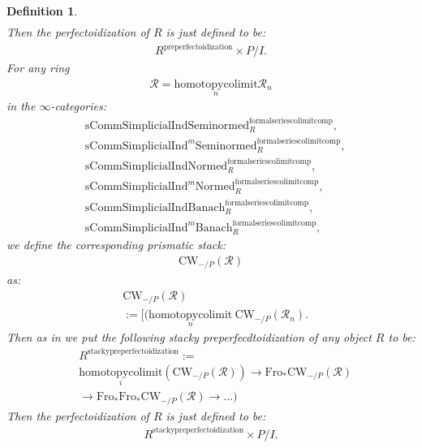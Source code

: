 \documentclass[12pt]{book}
\newtheorem{definition}{Definition}
\begin{document}
\begin{definition}
\begin{align}
\end{align}
Then the perfectoidization of $R$ is just defined to be:
\begin{align}
R^\mathrm{preperfectoidization}\times P/I.	
\end{align}
For any ring
\begin{align}
\mathcal{R}=\underset{n}{\mathrm{homotopycolimit}}\mathcal{R}_n	
\end{align}
in the $\infty$-categories:
\begin{align}
&\mathrm{sComm}\mathrm{Simplicial}\mathrm{Ind}\mathrm{Seminormed}^\mathrm{formalseriescolimitcomp}_R,\\
&\mathrm{sComm}\mathrm{Simplicial}\mathrm{Ind}^m\mathrm{Seminormed}^\mathrm{formalseriescolimitcomp}_R,\\
&\mathrm{sComm}\mathrm{Simplicial}\mathrm{Ind}\mathrm{Normed}^\mathrm{formalseriescolimitcomp}_R,\\
&\mathrm{sComm}\mathrm{Simplicial}\mathrm{Ind}^m\mathrm{Normed}^\mathrm{formalseriescolimitcomp}_R,\\
&\mathrm{sComm}\mathrm{Simplicial}\mathrm{Ind}\mathrm{Banach}^\mathrm{formalseriescolimitcomp}_R,\\
&\mathrm{sComm}\mathrm{Simplicial}\mathrm{Ind}^m\mathrm{Banach}^\mathrm{formalseriescolimitcomp}_R,	
\end{align}	
we define the corresponding prismatic stack:
\begin{align}
\mathrm{CW}_{-/P}(\mathcal{R})
\end{align}
as:
\begin{align}
&\mathrm{CW}_{-/P}(\mathcal{R})\\
&:=[(\underset{n}{\mathrm{homotopycolimit}}~ \mathrm{CW}_{-/P}(\mathcal{R}_n).	
\end{align}
Then as in \cite[Definition 8.2]{BS} we put the following stacky preperfecdtoidization of any object $R$ to be:
\begin{align}
&R^\mathrm{stackypreperfectoidization}:=\\
&\underset{i}{\mathrm{homotopycolimit}}(\mathrm{CW}_{-/P}(\mathcal{R}))\rightarrow \mathrm{Fro}_*\mathrm{CW}_{-/P}(\mathcal{R})\\
&\rightarrow \mathrm{Fro}_*\mathrm{Fro}_*\mathrm{CW}_{-/P}(\mathcal{R})\rightarrow...)	
\end{align}
Then the perfectoidization of $R$ is just defined to be:
\begin{align}
R^\mathrm{stackypreperfectoidization}\times P/I.	
\end{align}

\end{definition}
\end{document}
